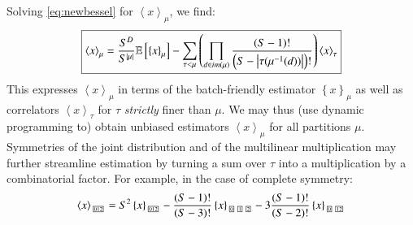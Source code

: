 \documentclass[openany, notitlepage, justified]{tufte-book}
\theoremstyle{plain}
\theoremstyle{definition}
\newcommand{\wrap}[1]{\left(#1\right)}
\newcommand{\wang}[1]{\left\langle#1\right\rangle}
\newcommand{\wabs}[1]{\left|#1\right|}
\newcommand{\wurl}[1]{\left\{#1\right\}}
\newcommand{\partitionbox}[1]{
    \text{
        \fboxsep=0.5pt
        \tiny
        \fbox{#1}
    }
}
\newcommand{\expct}[1]{\mathbb{E}\left[#1\right]}
\begin{document}
        Solving \ref{eq:newbessel} for $\wang{x}_\mu$, we find:
        \begin{equation*}
            \text{\fbox{$
            \wang{x}_\mu
            =
            \frac{S^D}{S^{\wabs{\mu}}}
            \expct{
                \wurl{x}_\mu
            }
            -
            \sum_{\tau < \mu} \wrap{
                \prod_{d\in im(\mu)}
                \frac{\wrap{S-1}!}{\wrap{S-\wabs{\tau(\mu^{-1}(d))}}!}
            }
            \wang{x}_\tau
            $}}
        \end{equation*}
        This expresses $\wang{x}_\mu$ in terms of the batch-friendly estimator
        $\wurl{x}_\mu$ as well as correlators $\wang{x}_\tau$ for $\tau$
        \emph{strictly} finer than $\mu$.  We may thus (use dynamic programming
        to) obtain unbiased estimators $\wang{x}_\mu$ for all partitions $\mu$.
        Symmetries of the joint distribution and of the multilinear
        multiplication may further streamline estimation by turning a sum over
        $\tau$ into a multiplication by a combinatorial factor.  For example,
        in the case of complete symmetry:
        $$
            \wang{x}_{\partitionbox{012}}
            =
            S^2
            \wurl{x}_{\partitionbox{012}}
            -
            \frac{(S-1)!}{(S-3)!}
            \wurl{x}_{\partitionbox{0}\partitionbox{1}\partitionbox{2}}
            -
            3\frac{(S-1)!}{(S-2)!}
            \wurl{x}_{\partitionbox{0}\partitionbox{12}}
        $$
\end{document}
